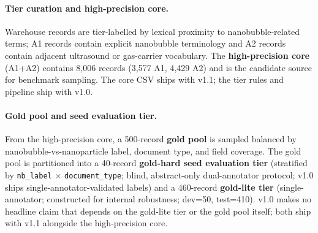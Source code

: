 \documentclass{article}
\begin{document}
\paragraph{Tier curation and high-precision core.}
Warehouse records are tier-labelled by lexical proximity to nanobubble-related terms; A1 records contain explicit nanobubble terminology and A2 records contain adjacent ultrasound or gas-carrier vocabulary. The \textbf{high-precision core} (A1+A2) contains 8{,}006 records (3{,}577 A1, 4{,}429 A2) and is the candidate source for benchmark sampling. The core CSV ships with v1.1; the tier rules and pipeline ship with v1.0.

\paragraph{Gold pool and seed evaluation tier.}
From the high-precision core, a 500-record \textbf{gold pool} is sampled balanced by nanobubble-vs-nanoparticle label, document type, and field coverage. The gold pool is partitioned into a 40-record \textbf{gold-hard seed evaluation tier} (stratified by \texttt{nb\_label} $\times$ \texttt{document\_type}; blind, abstract-only dual-annotator protocol; v1.0 ships single-annotator-validated labels) and a 460-record \textbf{gold-lite tier} (single-annotator; constructed for internal robustness; dev=50, test=410). v1.0 makes no headline claim that depends on the gold-lite tier or the gold pool itself; both ship with v1.1 alongside the high-precision core.
\end{document}
